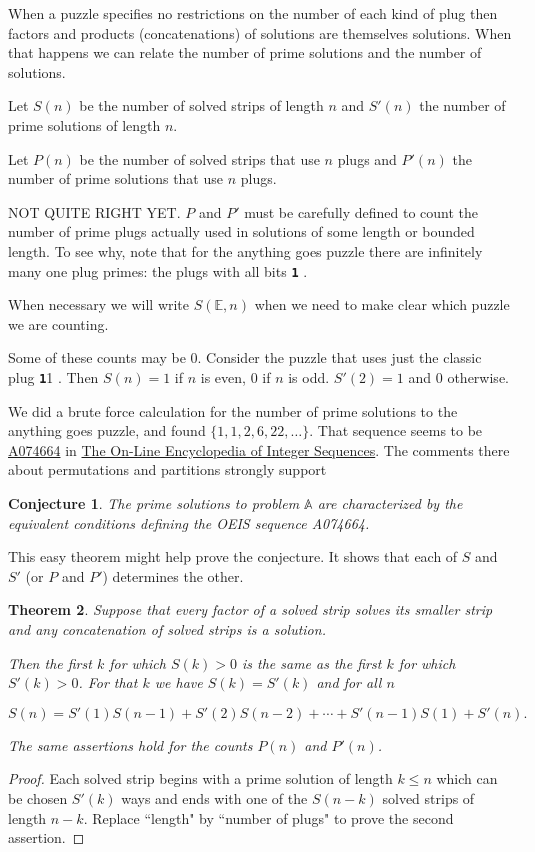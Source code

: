 \documentclass[10pt]{article}
\newtheorem{theorem}{Theorem}
\newtheorem{conjecture}[theorem]{Conjecture}
\numberwithin{equation}{section}
\newcommand{\plug}[1]{%
\mbox{{\textbf\texttt #1}}
}
\newcommand{\puzzle}[1]{%
   \ensuremath{
   \mathbb{#1}
   }
}
\begin{document}
When a puzzle specifies no restrictions on the number of each kind of plug then factors and products (concatenations) of solutions are themselves solutions.  When that  happens we can relate the number of prime solutions and the number of solutions.

Let   $S(n)$ be the number of solved strips of length $n$ and
 $S'(n)$ the number of prime solutions of length $n$. 
 
Let $P(n)$  be the number of solved strips that use $n$ plugs and
  $P'(n)$ the number of prime solutions that use $n$ plugs.

NOT QUITE RIGHT YET.  $P$ and $P'$ must be carefully defined to count the number of prime plugs actually used in solutions of some length or bounded length. To see why, note that for the anything goes puzzle there are infinitely many one plug primes: the plugs with all bits \plug{1}.

When necessary we will write $S(\puzzle{E},n)$ when we need to make clear which puzzle we are counting.

Some of these counts may be $0$. Consider the
puzzle that uses just the classic  plug \plug{11}.
Then $S(n) = 1$ if $n$ is even, $0$ if $n$ is odd. $S'(2) =1$ and
$0$  otherwise.


We did a brute force calculation for the number of prime solutions to the anything goes puzzle, and found $\{1,1,2,6,22, \ldots\}$. That sequence seems to be
\href{https://oeis.org/A074664}{A074664} in
\href{https://oeis.org}{The On-Line Encyclopedia of Integer
  Sequences}. The comments there about permutations and partitions
strongly support

\begin{conjecture}
The prime solutions to problem $\puzzle{A}$ are characterized by the
equivalent conditions defining the OEIS sequence A074664.
\end{conjecture}

This easy theorem might help prove the conjecture. It shows that each of $S$ and $S'$ (or $P$ and $P'$) determines the other.

\begin{theorem}\label{thm:primerecursion}
Suppose that every factor of a solved strip solves its smaller strip and any concatenation of solved strips is a solution.

 Then the  first $k$ for which $S(k) > 0$ is the same as the first $k$ for which $S'(k) > 0$. For that $k$ we have $S(k) = S'(k)$ and for all $n$
 
\begin{equation}\label{eq:convolution}
   S(n) = S'(1)S(n-1) +  S'(2)S(n-2) + \cdots +   S'(n-1)S(1) + S'(n) .
\end{equation}

The same assertions  hold for the counts $P(n)$ and $P'(n)$.
\end{theorem}
\begin{proof}
Each solved strip begins with a prime solution of length $k \le n$ which can be
chosen $S'(k)$ ways and ends with one of the $S(n-k)$ solved strips of
length $n-k$. 
Replace ``length" by ``number of plugs" to prove the second assertion.
\end{proof}
\end{document}
